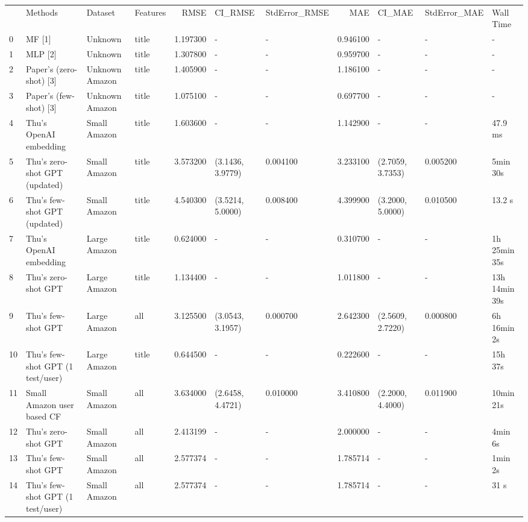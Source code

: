 \begin{tabular}{llllrllrlll}
 & Methods & Dataset & Features & RMSE & CI_RMSE & StdError_RMSE & MAE & CI_MAE & StdError_MAE & Wall Time \\
0 & MF [1] & Unknown & title & 1.197300 & - & - & 0.946100 & - & - & - \\
1 & MLP [2] & Unknown & title & 1.307800 & - & - & 0.959700 & - & - & - \\
2 & Paper's (zero-shot) [3] & Unknown Amazon & title & 1.405900 & - & - & 1.186100 & - & - & - \\
3 & Paper's (few-shot) [3] & Unknown Amazon & title & 1.075100 & - & - & 0.697700 & - & - & - \\
4 & Thu's OpenAI embedding & Small Amazon & title & 1.603600 & - & - & 1.142900 & - & - & 47.9 ms \\
5 & Thu's zero-shot GPT (updated) & Small Amazon & title & 3.573200 & (3.1436, 3.9779) & 0.004100 & 3.233100 & (2.7059, 3.7353) & 0.005200 & 5min 30s \\
6 & Thu's few-shot GPT (updated) & Small Amazon & title & 4.540300 & (3.5214, 5.0000) & 0.008400 & 4.399900 & (3.2000, 5.0000) & 0.010500 & 13.2 s \\
7 & Thu's OpenAI embedding & Large Amazon & title & 0.624000 & - & - & 0.310700 & - & - & 1h 25min 35s \\
8 & Thu's zero-shot GPT & Large Amazon & title & 1.134400 & - & - & 1.011800 & - & - & 13h 14min 39s \\
9 & Thu's few-shot GPT & Large Amazon & all & 3.125500 & (3.0543, 3.1957) & 0.000700 & 2.642300 & (2.5609, 2.7220) & 0.000800 & 6h 16min 2s \\
10 & Thu's few-shot GPT (1 test/user) & Large Amazon & title & 0.644500 & - & - & 0.222600 & - & - & 15h 37s \\
11 & Small Amazon user based CF & Small Amazon & all & 3.634000 & (2.6458, 4.4721) & 0.010000 & 3.410800 & (2.2000, 4.4000) & 0.011900 & 10min 21s \\
12 & Thu's zero-shot GPT & Small Amazon & all & 2.413199 & - & - & 2.000000 & - & - & 4min 6s \\
13 & Thu's few-shot GPT & Small Amazon & all & 2.577374 & - & - & 1.785714 & - & - & 1min 2s \\
14 & Thu's few-shot GPT (1 test/user) & Small Amazon & all & 2.577374 & - & - & 1.785714 & - & - & 31 s \\
\end{tabular}

